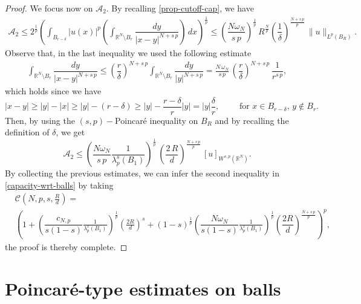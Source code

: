 \documentclass{amsart}
\theoremstyle{definition}
\numberwithin{equation}{section}
\begin{document}
\begin{proof}
	We focus now on $\mathcal{A}_2$. By recalling \eqref{prop-cutoff-cap}, we have 
	\begin{align*} 
		\mathcal{A}_2 \le 2^{\frac{1}{p}} \left(\int_{B_{r - \delta}} |u(x)|^p \left(\int_{\mathbb{R}^N \setminus B_r} \dfrac{dy}{|x-y|^{N+s\,p}}\right)\,dx \right)^{\frac{1}{p}} \le  \left(\dfrac{N \omega_N}{s\,p}\right)^{\frac{1}{p}}\,R^{\frac{N}{p}} \left(\dfrac{1}{\delta}\right)^{\frac{N+s\,p}{p}} \,\|u\|_{L^p(B_R)}.
	\end{align*}
	Observe that, in the last inequality we used the following estimate
	\[
	\begin{split}
		\int_{\mathbb{R}^N \setminus B_r} \dfrac{dy}{|x-y|^{N+s\,p}} \leq \left(\dfrac{r}{\delta}\right)^{N+s\,p} \int_{\mathbb{R}^N \setminus B_r} \dfrac{dy}{|y|^{N+s\,p}} = \frac{N\,\omega_N}{s\,p}\,\left(\dfrac{r}{\delta}\right)^{N+ s\,p}\,\dfrac{1}{r^{s\,p}},
	\end{split}
	\]
	which holds since we have
	\[
	|x - y| \geq |y| - |x| \geq |y| - (r-\delta) \geq |y| - \dfrac{r-\delta}{r} |y| = |y| \dfrac{\delta}{r}, \qquad \mbox{ for } x \in B_{r-\delta}, \, y \notin B_{r}.
	\]
	Then, by using the $(s,p)-$Poincar\'e inequality on $B_R$ and by recalling the definition of $\delta$, we get 
	\begin{equation*} 
		\mathcal{A}_2 \le \left(\dfrac{N \omega_N}{s\,p} \frac{1}{\lambda^s_{p}(B_1)}\right)^{\frac{1}{p}} \, \left(\dfrac{2\,R}{d}\right)^{\frac{N+s\,p}{p}} \,[u]_{W^{s,p}(\mathbb{R}^N)}.
	\end{equation*}
	By collecting the previous estimates, we can infer the second inequality in \eqref{capacity-wrt-balls} by taking 
	\begin{equation} \label{costante-cap-wrt-balls}
		\begin{split}
			&\mathscr{C}\left(N, p, s, \frac{R}{d}\right) = \\ 
			&\left(1 +  \left(\dfrac{c_{N,p}}{s(1-s)} \frac{1}{\lambda^s_{p}(B_1)}\right)^{\frac{1}{p}}\left(\frac{2R}{d}\right)^s +  (1-s)^{\frac{1}{p}}\left(\dfrac{N \omega_N}{s(1-s)} \frac{1}{\lambda^s_{p}(B_1)}\right)^{\frac{1}{p}} \left(\dfrac{2R}{d}\right)^{\frac{N+s\,p}{p}}\right)^p,
		\end{split}
	\end{equation}
the proof is thereby complete. 
\end{proof}

\section{Poincar\'e-type estimates on balls}
\label{sec:3}
\end{document}
